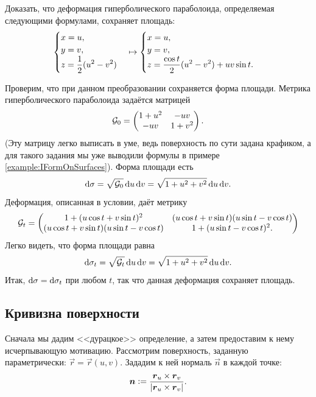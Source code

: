 \begin{problem}
	Доказать, что деформация гиперболического параболоида, определяемая следующими формулами, сохраняет площадь:
	\[
		\begin{cases}
			x = u,\\
			y = v,\\
			\displaystyle z = \frac{1}{2}(u^2 - v^2)
		\end{cases}
		\mapsto
		\begin{cases}
			x = u,\\
			y = v,\\
			\displaystyle z = \frac{\cos t}{2}(u^2 - v^2) + uv\sin t.
		\end{cases}
	\]
\end{problem}

\begin{solution}
	Проверим, что при данном преобразовании сохраняется форма площади. Метрика гиперболического параболоида задаётся матрицей
	\[
		\mathcal{G}_0 =
		\begin{pmatrix}
			1 + u^2 & -uv\\
			-uv & 1 + v^2
		\end{pmatrix}.
	\]
	(Эту матрицу легко выписать в уме, ведь поверхность по сути задана крафиком, а для такого задания мы уже выводили формулы в примере \ref{example:IFormOnSurfaces}). Форма площади есть
	\[
		\mathop{}\!\mathrm{d}\sigma = \sqrt{\mathcal{G}_0}\mathop{}\!\mathrm{d} u\mathop{}\!\mathrm{d} v = \sqrt{1 + u^2 + v^2}\mathop{}\!\mathrm{d} u\mathop{}\!\mathrm{d} v.
	\]
	Деформация, описанная в условии, даёт метрику
	\[
		\mathcal{G}_t =
		\begin{pmatrix}
			1 + (u\cos t + v\sin t)^2 & (u\cos t + v\sin t)(u\sin t - v\cos t)\\
			(u\cos t + v\sin t)(u\sin t - v\cos t) & 1 + (u\sin t - v\cos t)^2.
		\end{pmatrix}
	\]
	Легко видеть, что форма площади равна
	\[
		\mathop{}\!\mathrm{d}\sigma_t = \sqrt{\mathcal{G}_t}\mathop{}\!\mathrm{d} u\mathop{}\!\mathrm{d} v = \sqrt{1 + u^2 + v^2}\mathop{}\!\mathrm{d} u\mathop{}\!\mathrm{d} v.
	\]
	Итак, $\mathop{}\!\mathrm{d}\sigma = \mathop{}\!\mathrm{d}\sigma_t$ при любом $t$, так что данная деформация сохраняет площадь.
\end{solution}


\subsection{Кривизна поверхности}

Сначала мы дадим <<дурацкое>> определение, а затем предоставим к нему исчерпывающую мотивацию. Рассмотрим поверхность, заданную параметрически: $\vec{r} = \vec{r}(u, v)$. Зададим к ней нормаль $\vec{n}$ в каждой точке:
\[
	\boldsymbol{n} \vcentcolon = \frac{\boldsymbol{r}_u \times \boldsymbol{r}_v}{\left\lvert\boldsymbol{r}_u \times \boldsymbol{r}_v\right\rvert}.
\]

